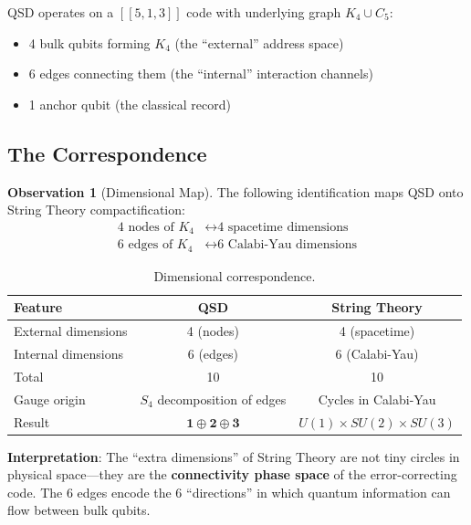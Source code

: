 \documentclass[11pt,a4paper]{article}
\theoremstyle{definition}
\newtheorem{observation}[theorem]{Observation}
\begin{document}
QSD operates on a $[[5,1,3]]$ code with underlying graph $K_4 \cup C_5$:
\begin{itemize}[nosep]
    \item 4 bulk qubits forming $K_4$ (the ``external'' address space)
    \item 6 edges connecting them (the ``internal'' interaction channels)
    \item 1 anchor qubit (the classical record)
\end{itemize}

\subsection{The Correspondence}

\begin{observation}[Dimensional Map]
The following identification maps QSD onto String Theory compactification:
\begin{align}
\text{4 nodes of } K_4 &\longleftrightarrow \text{4 spacetime dimensions} \\
\text{6 edges of } K_4 &\longleftrightarrow \text{6 Calabi-Yau dimensions}
\end{align}
\end{observation}

\begin{table}[h]
\centering
\begin{tabular}{lcc}
\toprule
\textbf{Feature} & \textbf{QSD} & \textbf{String Theory} \\
\midrule
External dimensions & 4 (nodes) & 4 (spacetime) \\
Internal dimensions & 6 (edges) & 6 (Calabi-Yau) \\
Total & 10 & 10 \\
Gauge origin & $S_4$ decomposition of edges & Cycles in Calabi-Yau \\
Result & $\mathbf{1} \oplus \mathbf{2} \oplus \mathbf{3}$ & $U(1) \times SU(2) \times SU(3)$ \\
\bottomrule
\end{tabular}
\caption{Dimensional correspondence.}
\end{table}

\textbf{Interpretation}: The ``extra dimensions'' of String Theory are not tiny circles in physical space---they are the \textbf{connectivity phase space} of the error-correcting code. The 6 edges encode the 6 ``directions'' in which quantum information can flow between bulk qubits.

\end{document}
